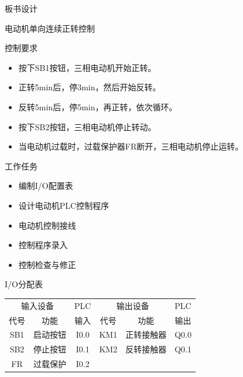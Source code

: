 {\begin{landscape}
\end{landscape}
\clearpage

\begin{center}
{\huge 板书设计}
\end{center}
}

\begin{frame}[containsverbatim]{电动机单向连续正转控制}
\begin{block}{控制要求}
\begin{itemize}
\item 按下SB1按钮，三相电动机开始正转。
\item 正转5min后，停3min，然后开始反转。
\item 反转5min后，停5min，再正转，依次循环。
\item 按下SB2按钮，三相电动机停止转动。
\item 当电动机过载时，过载保护器FR断开，三相电动机停止运转。
\end{itemize}
\end{block}
\end{frame}
\begin{frame}{}
\begin{block}{工作任务}
\begin{itemize}
\item 编制I/O配置表
\item 设计电动机PLC控制程序
\item 电动机控制接线
\item 控制程序录入
\item 控制检查与修正
\end{itemize}
\end{block}
\end{frame}
\begin{frame}
\begin{block}{I/O分配表}
\begin{small}
\begin{tabular}{|c|c|c|c|c|c|}
\hline 
\multicolumn{2}{|c|}{输入设备} & PLC &\multicolumn{2}{|c|}{输出设备} & PLC \\ 
\cline{1-2}\cline{4-5}
代号 & 功能 & 输入 & 代号 & 功能 & 输出 \\ 
\hline 
SB1 & 启动按钮 & I0.0 & KM1 & 正转接触器 & Q0.0 \\ 
\hline 
SB2 & 停止按钮 & I0.1 & KM2 & 反转接触器& Q0.1 \\ 
\hline 
FR & 过载保护 & I0.2 &  &  &  \\ 
\hline
\end{tabular} 
\end{small}
\end{block}
\end{frame}
